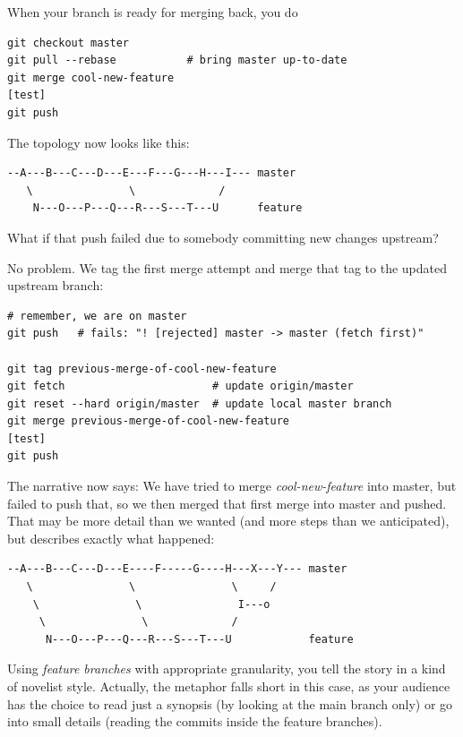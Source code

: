 \documentclass[12pt,pdftex]{article}
\begin{document}
\bigskip

When your branch is ready for merging back, you do
\lstset{frame=single,basicstyle=\ttfamily\footnotesize,language=sh,label= ,caption= ,captionpos=b,numbers=none}
\begin{lstlisting}
git checkout master
git pull --rebase           # bring master up-to-date
git merge cool-new-feature
[test]
git push
\end{lstlisting}

The topology now looks like this:
\begin{verbatim}
--A---B---C---D---E---F---G---H---I--- master
   \               \             /
    N---O---P---Q---R---S---T---U      feature
\end{verbatim}

\bigskip

What if that push failed due to somebody committing new changes
upstream?

No problem.
We tag the first merge attempt and merge that tag to the updated
upstream branch:
\lstset{frame=single,basicstyle=\ttfamily\footnotesize,language=sh,label= ,caption= ,captionpos=b,numbers=none}
\begin{lstlisting}
# remember, we are on master
git push   # fails: "! [rejected] master -> master (fetch first)"

git tag previous-merge-of-cool-new-feature
git fetch                       # update origin/master
git reset --hard origin/master  # update local master branch
git merge previous-merge-of-cool-new-feature
[test]
git push
\end{lstlisting}

The narrative now says:
We have tried to merge \emph{cool-new-feature} into master, but failed to
push that, so we then merged that first merge into master and pushed.
That may be more detail than we wanted (and more steps than we
anticipated), but describes exactly what happened:

\begin{verbatim}
--A---B---C---D---E----F-----G----H---X---Y--- master
   \               \               \     /
    \               \               I---o
     \               \             /
      N---O---P---Q---R---S---T---U            feature
\end{verbatim}


\bigskip


Using \emph{feature branches} with appropriate granularity, you tell the
story in a kind of novelist style.
Actually, the metaphor falls short in this case, as your audience has
the choice to read just a synopsis (by looking at the main branch only)
or go into small details (reading the commits inside the feature
branches).
\end{document}
